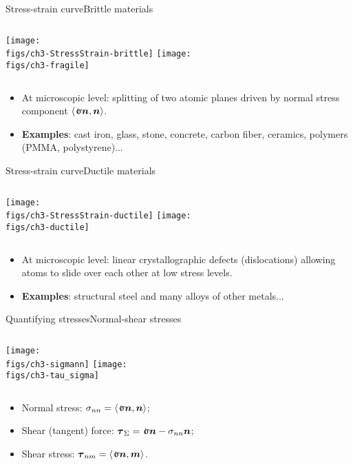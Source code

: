 \begin{frame}{Stress-strain curve}{Brittle materials}

\begin{columns}[t]
\hspace*{-0.8truecm}\centering\texttt{[image: \\figs/ch3-StressStrain-brittle]}
\hspace*{-1.0truecm}\centering\texttt{[image: \\figs/ch3-fragile]}
\end{columns}
\vskip10pt
\begin{itemize}
\item At microscopic level: splitting of two atomic planes driven by normal stress component $\scal{\stress\nv,\nv}$.
\item {\bf Examples}: cast iron, glass, stone, concrete, carbon fiber, ceramics, polymers (PMMA, polystyrene)...
\end{itemize}

\end{frame}

\begin{frame}{Stress-strain curve}{Ductile materials}

\begin{columns}[t]
\hspace*{-0.3truecm}\centering\texttt{[image: \\figs/ch3-StressStrain-ductile]}
\centering\texttt{[image: \\figs/ch3-ductile]}
\end{columns}
\vskip10pt
\begin{itemize}
\item At microscopic level:  linear crystallographic defects (dislocations) allowing atoms to slide over each other at low stress levels.
\item {\bf Examples}: structural steel and many alloys of other metals...
\end{itemize}

\end{frame}

\begin{frame}{Quantifying stresses}{Normal-shear stresses}

\begin{columns}[t]
\centering\texttt{[image: \\figs/ch3-sigmann]}
\centering\texttt{[image: \\figs/ch3-tau\_sigma]}
\end{columns}
\begin{itemize}
\item Normal stress: $\stressj_{\nj\nj}=\scal{\stress\nv,\nv}$;
\item Shear (tangent) force: $\tress_\Sigma=\stress\nv-\stressj_{\nj\nj}\nv$;
\item Shear stress: $\tress_{\nj\mj}=\scal{\stress\nv,\mv}$.
\end{itemize}

\end{frame}

